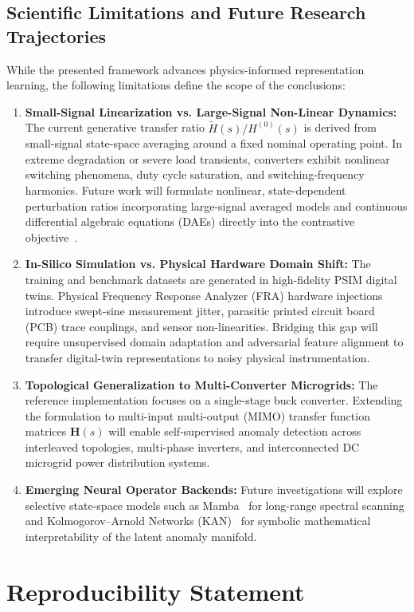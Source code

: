 \documentclass[11pt,a4paper]{article}
\begin{document}
\subsection{Scientific Limitations and Future Research Trajectories}
While the presented framework advances physics-informed representation learning, the following limitations define the scope of the conclusions:
\begin{enumerate}
    \item \textbf{Small-Signal Linearization vs. Large-Signal Non-Linear Dynamics:} The current generative transfer ratio $\tilde{H}(s)/H^{(0)}(s)$ is derived from small-signal state-space averaging around a fixed nominal operating point. In extreme degradation or severe load transients, converters exhibit nonlinear switching phenomena, duty cycle saturation, and switching-frequency harmonics. Future work will formulate nonlinear, state-dependent perturbation ratios incorporating large-signal averaged models and continuous differential algebraic equations (DAEs) directly into the contrastive objective~\cite{raissi2019pinn}.
    \item \textbf{In-Silico Simulation vs. Physical Hardware Domain Shift:} The training and benchmark datasets are generated in high-fidelity PSIM digital twins. Physical Frequency Response Analyzer (FRA) hardware injections introduce swept-sine measurement jitter, parasitic printed circuit board (PCB) trace couplings, and sensor non-linearities. Bridging this gap will require unsupervised domain adaptation and adversarial feature alignment to transfer digital-twin representations to noisy physical instrumentation.
    \item \textbf{Topological Generalization to Multi-Converter Microgrids:} The reference implementation focuses on a single-stage buck converter. Extending the formulation to multi-input multi-output (MIMO) transfer function matrices $\mathbf{H}(s)$ will enable self-supervised anomaly detection across interleaved topologies, multi-phase inverters, and interconnected DC microgrid power distribution systems.
    \item \textbf{Emerging Neural Operator Backends:} Future investigations will explore selective state-space models such as Mamba~\cite{gu2023mamba} for long-range spectral scanning and Kolmogorov--Arnold Networks (KAN)~\cite{liu2024kan} for symbolic mathematical interpretability of the latent anomaly manifold.
\end{enumerate}

\section{Reproducibility Statement}
\label{sec:reproducibility}
\end{document}
